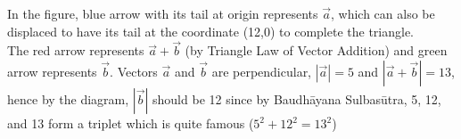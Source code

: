 \documentclass[journal, 12pt, twocolumn]{article}
\begin{document}
In the figure, blue arrow with its tail at origin represents $\vec{a}$, which can also be displaced to have its tail at the coordinate (12,0) to complete the triangle.\\
The red arrow represents $\vec{a}+\vec{b}$ (by Triangle Law of Vector Addition) and green arrow represents $\vec{b}$. Vectors $\vec{a}$ and $\vec{b}$ are perpendicular, $\left| \vec{a} \right| = 5$ and $\left| \vec{a}+\vec{b} \right| = 13$, hence by the diagram, $\left| \vec{b} \right|$ should be 12 since by Baudhāyana Sulbasūtra, 5, 12, and 13 form a triplet which is quite famous ($5^2+12^2=13^2$)
\end{document}
